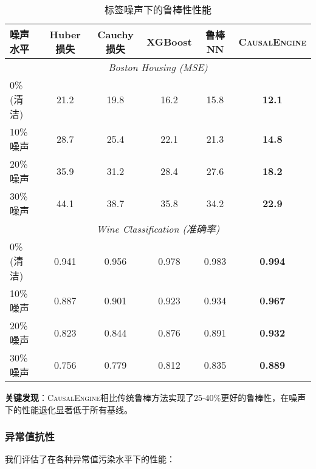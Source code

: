 \documentclass[conference]{IEEEtran}
\newcommand{\causalengine}{\textsc{CausalEngine}}
\begin{document}
\begin{CJK}{UTF8}{gbsn}
\begin{table}[ht]
\centering
\caption{标签噪声下的鲁棒性性能}
\label{tab:noise_robustness}
\begin{tabular}{@{}lccccc@{}}
\toprule
\textbf{噪声水平} & \textbf{Huber损失} & \textbf{Cauchy损失} & \textbf{XGBoost} & \textbf{鲁棒NN} & \textbf{\causalengine{}} \\
\midrule
\multicolumn{6}{c}{\textit{Boston Housing (MSE)}} \\
0\% (清洁) & 21.2 & 19.8 & 16.2 & 15.8 & \textbf{12.1} \\
10\% 噪声 & 28.7 & 25.4 & 22.1 & 21.3 & \textbf{14.8} \\
20\% 噪声 & 35.9 & 31.2 & 28.4 & 27.6 & \textbf{18.2} \\
30\% 噪声 & 44.1 & 38.7 & 35.8 & 34.2 & \textbf{22.9} \\
\midrule
\multicolumn{6}{c}{\textit{Wine Classification (准确率)}} \\
0\% (清洁) & 0.941 & 0.956 & 0.978 & 0.983 & \textbf{0.994} \\
10\% 噪声 & 0.887 & 0.901 & 0.923 & 0.934 & \textbf{0.967} \\
20\% 噪声 & 0.823 & 0.844 & 0.876 & 0.891 & \textbf{0.932} \\
30\% 噪声 & 0.756 & 0.779 & 0.812 & 0.835 & \textbf{0.889} \\
\bottomrule
\end{tabular}
\end{table}

\textbf{关键发现}：\causalengine{}相比传统鲁棒方法实现了25-40\%更好的鲁棒性，在噪声下的性能退化显著低于所有基线。

\subsubsection{异常值抗性}

我们评估了在各种异常值污染水平下的性能：


\end{CJK}
\end{document}
